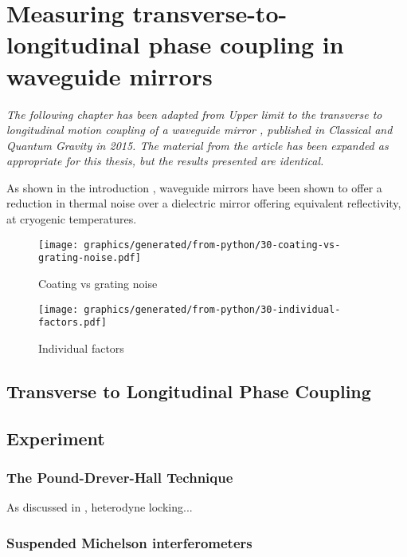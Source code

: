 \chapter{Measuring transverse-to-longitudinal phase coupling in waveguide mirrors}
\label{c:waveguides}

\emph{The following chapter has been adapted from \emph{Upper limit to the transverse to longitudinal motion coupling of a waveguide mirror \cite{Leavey2015}}, published in Classical and Quantum Gravity in 2015. The material from the article has been expanded as appropriate for this thesis, but the results presented are identical.}

As shown in the introduction , waveguide mirrors have been shown to offer a reduction in thermal noise over a dielectric mirror offering equivalent reflectivity, at cryogenic temperatures.


\begin{figure}
  \centering
  \texttt{[image: graphics/generated/from-python/30-coating-vs-grating-noise.pdf]}
  \caption{Coating vs grating noise}
  \label{fig:coating-vs-grating-noise}
\end{figure}

\begin{figure}
  \centering
  \texttt{[image: graphics/generated/from-python/30-individual-factors.pdf]}
  \caption{Individual factors}
  \label{fig:individual-factors}
\end{figure}

\section{Transverse to Longitudinal Phase Coupling}

\section{Experiment}
\subsection{The Pound-Drever-Hall Technique}
As discussed in , heterodyne locking...

\subsection{Suspended Michelson interferometers}

